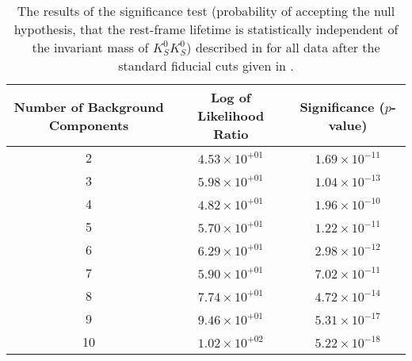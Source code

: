 \begin{table}[ht]
    \begin{center}
        \begin{tabular}{ccc}\toprule
            Number of Background Components & Log of Likelihood Ratio & Significance ($p$-value) \\\midrule
             2 & $4.53 \times 10^{+01}$ & $1.69 \times 10^{-11}$ \\
             3 & $5.98 \times 10^{+01}$ & $1.04 \times 10^{-13}$ \\
             4 & $4.82 \times 10^{+01}$ & $1.96 \times 10^{-10}$ \\
             5 & $5.70 \times 10^{+01}$ & $1.22 \times 10^{-11}$ \\
             6 & $6.29 \times 10^{+01}$ & $2.98 \times 10^{-12}$ \\
             7 & $5.90 \times 10^{+01}$ & $7.02 \times 10^{-11}$ \\
             8 & $7.74 \times 10^{+01}$ & $4.72 \times 10^{-14}$ \\
             9 & $9.46 \times 10^{+01}$ & $5.31 \times 10^{-17}$ \\
             10 & $1.02 \times 10^{+02}$ & $5.22 \times 10^{-18}$ \\\bottomrule
        \end{tabular}
        \caption{The results of the significance test (probability of accepting the null hypothesis, that the rest-frame lifetime is statistically independent of the invariant mass of $K_S^0K_S^0$) described in  for all data after the standard fiducial cuts given in .}\label{tab:independence-test}
    \end{center}
\end{table}